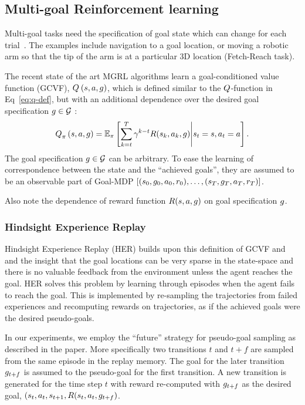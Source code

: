 \subsection{Multi-goal Reinforcement learning}
Multi-goal tasks need the specification of goal state which can change for each
trial~\citep{plappert201802multigoalrl}. The examples include navigation to a
goal location, or moving a robotic arm so that the tip of the arm is at a
particular 3D location (Fetch-Reach task).

The recent state of the art MGRL algorithms learn a goal-conditioned value
function (GCVF), $Q_{}^{}\left({s}, {a}, {g}\right)$, which is defined similar to the
$Q$-function in Eq~\ref{eq:q-def}, but with an additional dependence over the
desired goal specification $g \in \mathcal{G}$ :
%
\begin{align}
Q_{\pi}^{}\left({s}, {a}, {g}\right) = \mathbb{E}_\pi\left[ \sum_{k=t}^T
  \gamma^{k-t} R(s_k, a_k, g)
  \middle| s_t = s, a_t = a \right] .
  \label{eq:q-def}
\end{align}%
%
The goal specification $g \in \mathcal{G}$ can be arbitrary. To ease the learning
of correspondence between the state and the ``achieved goals'', they are assumed
to be an observable part of Goal-MDP $[(s_0, g_0, a_0, r_0), \dots,
(s_T, g_T, a_T, r_T)]$.

Also note the dependence of reward function $R(s, a, g)$ on goal
specification $g$.

\subsubsection{Hindsight Experience Replay}
Hindsight Experience Replay (HER) builds upon this definition of GCVF
and and the insight that the goal locations can be very sparse in the
state-space and there is no valuable feedback from the environment unless the
agent reaches the goal.
HER solves this problem by learning through episodes when the agent fails to
reach the goal. This is implemented by re-sampling the trajectories from failed
experiences and recomputing rewards on trajectories, as if the achieved
goals were the desired pseudo-goals.

In our experiments, we employ the ``future'' strategy for pseudo-goal sampling
as described in the paper. More specifically two transitions $t$ and $t+f$ are
sampled from the same episode in the replay memory. The goal for the later
transition $g_{t+f}$ is assumed to the pseudo-goal for the first transition.
A new transition is generated for the time step $t$ with reward re-computed
with $g_{t+f}$ as the desired goal, $(s_{t}, a_t, s_{t+1},
R(s_t, a_t, g_{t+f})$.


